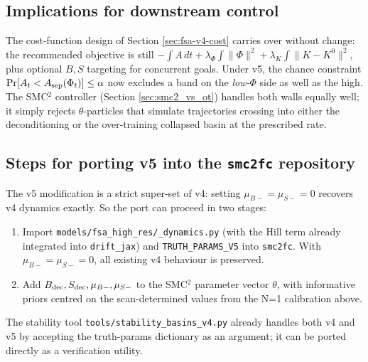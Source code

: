 \subsection{Implications for downstream control}

The cost-function design of Section \ref{sec:fsa-v4-cost} carries over without change: the recommended objective is still $-\int A\, dt + \lambda_\Phi \int \|\Phi\|^2 + \lambda_K \int \|K - K^0\|^2$, plus optional $B,S$ targeting for concurrent goals. Under v5, the chance constraint $\Pr[A_t < A_{\rm sep}(\Phi_t)] \le \alpha$ now excludes a band on the \emph{low-$\Phi$} side as well as the high. The SMC$^2$ controller (Section \ref{sec:smc2_vs_ot}) handles both walls equally well; it simply rejects $\theta$-particles that simulate trajectories crossing into either the deconditioning or the over-training collapsed basin at the prescribed rate.

\subsection{Steps for porting v5 into the \texttt{smc2fc} repository}

The v5 modification is a strict super-set of v4: setting $\mu_{B-} = \mu_{S-} = 0$ recovers v4 dynamics exactly. So the port can proceed in two stages:

\begin{enumerate}
  \item Import \texttt{models/fsa\_high\_res/\_dynamics.py} (with the Hill term already integrated into \texttt{drift\_jax}) and \texttt{TRUTH\_PARAMS\_V5} into \texttt{smc2fc}. With $\mu_{B-} = \mu_{S-} = 0$, all existing v4 behaviour is preserved.
  \item Add $B_{\rm dec}, S_{\rm dec}, \mu_{B-}, \mu_{S-}$ to the SMC$^2$ parameter vector $\theta$, with informative priors centred on the scan-determined values from the N=1 calibration above.
\end{enumerate}

The stability tool \texttt{tools/stability\_basins\_v4.py} already handles both v4 and v5 by accepting the truth-params dictionary as an argument; it can be ported directly as a verification utility.
